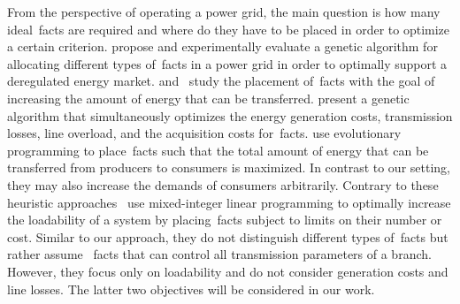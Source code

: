 From the perspective of operating a power grid, the main question is how many
ideal~\gls{facts} are required and where do they have to be placed in order
to optimize a certain criterion. \textcite{1397562} propose and experimentally
evaluate a genetic algorithm for allocating different types of~\gls{facts}
in a power grid in order to optimally support a deregulated energy market.
\textcite{gcg-olmtf-01} and~\textcite{1465551} study the placement
of~\gls{facts} with the goal of increasing the amount of energy that can be
transferred. \textcite{gcg-olmtf-01} present a genetic algorithm that
simultaneously optimizes the energy generation costs, transmission losses, line
overload, and the acquisition costs for~\gls{facts}. \textcite{1465551} use
evolutionary programming to place~\gls{facts} such that the total amount of
energy that can be transferred from producers to consumers is maximized. In
contrast to our setting, they may also increase the demands of consumers
arbitrarily. Contrary to these heuristic approaches~\textcite{lgkm-psp-03} use
mixed-integer linear programming to optimally increase the loadability of a
system by placing~\gls{facts} subject to limits on their number or cost.
Similar to our approach, they do not distinguish different types
of~\gls{facts} but rather assume ~\gls{facts} that
can control all transmission parameters of a branch.  However, they focus only
on loadability and do not consider generation costs and line losses. The latter
two objectives will be considered in our work.

